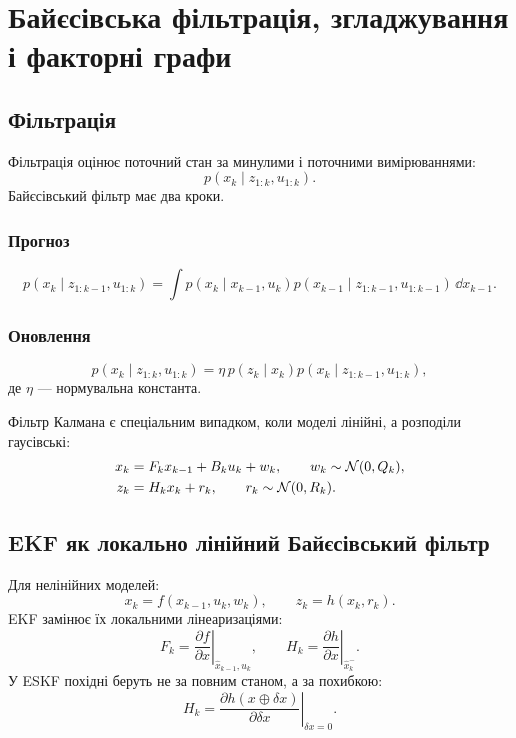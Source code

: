 
\chapter{Байєсівська фільтрація, згладжування і факторні графи}


\section{Фільтрація}

Фільтрація оцінює поточний стан за минулими і поточними вимірюваннями:
\[
p(x_k\mid z_{1:k},u_{1:k}).
\]
Байєсівський фільтр має два кроки.

\subsection{Прогноз}
\[
p(x_k\mid z_{1:k-1},u_{1:k})
=
\int p(x_k\mid x_{k-1},u_k)
p(x_{k-1}\mid z_{1:k-1},u_{1:k-1})\,\dd x_{k-1}.
\]

\subsection{Оновлення}
\[
p(x_k\mid z_{1:k},u_{1:k})
=
\eta\, p(z_k\mid x_k)
p(x_k\mid z_{1:k-1},u_{1:k}),
\]
де $\eta$ --- нормувальна константа.

Фільтр Калмана є спеціальним випадком, коли моделі лінійні, а розподіли гаусівські:
\begin{align}
x_k &= F_kx_{k-1}+B_ku_k+w_k,\qquad w_k\sim\mathcal{N}(0,Q_k),\\
z_k &= H_kx_k+r_k,\qquad r_k\sim\mathcal{N}(0,R_k).
\end{align}

\section{EKF як локально лінійний Байєсівський фільтр}

Для нелінійних моделей:
\[
x_k=f(x_{k-1},u_k,w_k),\qquad z_k=h(x_k,r_k).
\]
EKF замінює їх локальними лінеаризаціями:
\[
F_k = \left.\frac{\partial f}{\partial x}\right|_{\hat x_{k-1},u_k},\qquad
H_k = \left.\frac{\partial h}{\partial x}\right|_{\hat x_k^-}.
\]
У ESKF похідні беруть не за повним станом, а за похибкою:
\[
H_k = \left.\frac{\partial h(x\oplus\delta x)}{\partial\delta x}\right|_{\delta x=0}.
\]


